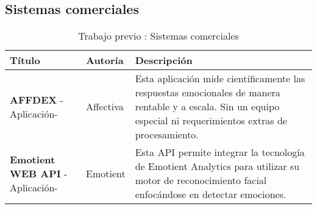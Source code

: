     \subsection{Sistemas comerciales}

			\begin{table}[H]
			\centering
				
				\begin{tabularx}{\textwidth}{|p{30mm}|p{25mm}|X|}


					\hline
					Título & Autoría & Descripción\\
					\hline
					\hline
					{\bfseries AFFDEX} -Aplicación- 
					& Affectiva
					& Esta aplicación mide científicamente las respuestas emocionales de manera rentable y a escala. Sin un equipo especial ni requerimientos extras de procesamiento.
					\\
					\hline
					{\bfseries Emotient WEB API} -Aplicación- 
					& Emotient
					& Esta API permite integrar la tecnología de Emotient Analytics para utilizar su motor de reconocimiento facial enfocándose en detectar emociones.
					\\
					\hline
						
				\end{tabularx}
				
			\caption{Trabajo previo : Sistemas comerciales}
		\end{table}

